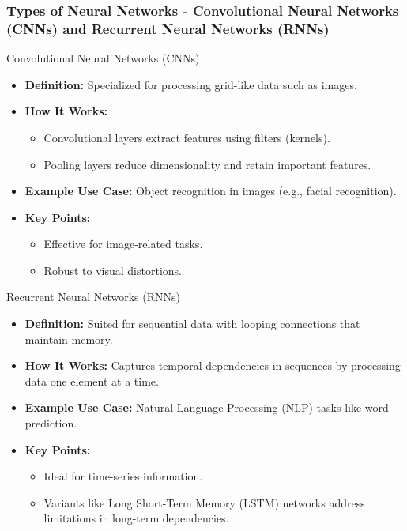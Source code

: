 \documentclass[aspectratio=169]{beamer}
\begin{document}
\begin{frame}[fragile]
    \frametitle{Types of Neural Networks - Convolutional Neural Networks (CNNs) and Recurrent Neural Networks (RNNs)}
    \begin{block}{Convolutional Neural Networks (CNNs)}
        \begin{itemize}
            \item \textbf{Definition:} Specialized for processing grid-like data such as images.
            \item \textbf{How It Works:}
                \begin{itemize}
                    \item Convolutional layers extract features using filters (kernels).
                    \item Pooling layers reduce dimensionality and retain important features.
                \end{itemize}
            \item \textbf{Example Use Case:} Object recognition in images (e.g., facial recognition).
            \item \textbf{Key Points:}
                \begin{itemize}
                    \item Effective for image-related tasks.
                    \item Robust to visual distortions.
                \end{itemize}
        \end{itemize}
    \end{block}
    
    \begin{block}{Recurrent Neural Networks (RNNs)}
        \begin{itemize}
            \item \textbf{Definition:} Suited for sequential data with looping connections that maintain memory.
            \item \textbf{How It Works:} Captures temporal dependencies in sequences by processing data one element at a time.
            \item \textbf{Example Use Case:} Natural Language Processing (NLP) tasks like word prediction.
            \item \textbf{Key Points:}
                \begin{itemize}
                    \item Ideal for time-series information.
                    \item Variants like Long Short-Term Memory (LSTM) networks address limitations in long-term dependencies.
                \end{itemize}
        \end{itemize}
    \end{block}
\end{frame}
\end{document}

